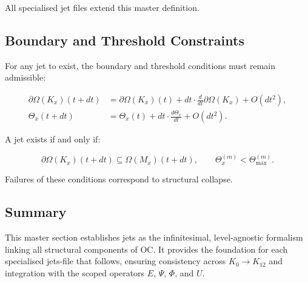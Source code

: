 All specialised jet files extend this master definition.



\subsection{Boundary and Threshold Constraints}

For any jet to exist, the boundary and threshold conditions must remain
admissible:

\begin{align}
\partial\Omega(K_x)(t + dt) &= \partial\Omega(K_x)(t)
  + dt \cdot \frac{d}{dt}\partial\Omega(K_x)
  + O(dt^2), \\
\Theta_x(t + dt) &= \Theta_x(t)
  + dt \cdot \frac{d\Theta_x}{dt}
  + O(dt^2).
\end{align}

A jet exists if and only if:

\[
\partial\Omega(K_x)(t+dt) \subseteq \Omega(M_x)(t+dt),
\qquad
\Theta_x^{(m)} < \Theta_{\mathrm{max}}^{(m)}.
\]

Failures of these conditions correspond to structural collapse.



\subsection{Summary}

This master section establishes jets as the infinitesimal, level-agnostic
formalism linking all structural components of OC. It provides the
foundation for each specialised jets-file that follows, ensuring
consistency across $K_0 \to K_{12}$ and integration with the scoped
operators $E$, $\Psi$, $\Phi$, and $U$.
